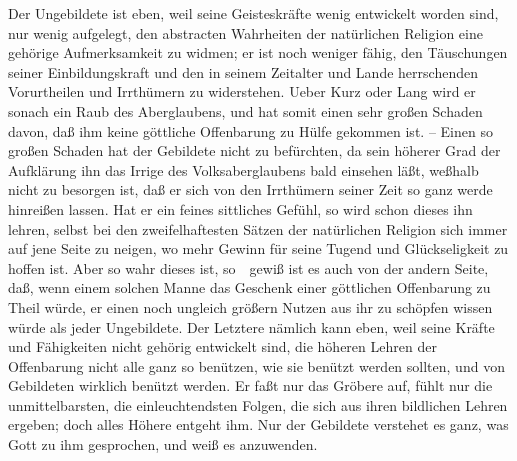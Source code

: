 \begin{aufza}
\item {} Der Ungebildete ist eben, weil seine Geisteskräfte wenig entwickelt worden sind, nur wenig aufgelegt, den abstracten Wahrheiten der natürlichen Religion eine gehörige Aufmerksamkeit zu widmen; er ist noch weniger fähig, den Täuschungen seiner Einbildungskraft und den in seinem Zeitalter und Lande herrschenden Vorurtheilen und Irrthümern zu widerstehen. Ueber Kurz oder Lang wird er sonach ein Raub des Aberglaubens, und hat somit einen sehr großen Schaden davon, daß ihm keine göttliche Offenbarung zu Hülfe gekommen ist. -- Einen so großen Schaden hat der Gebildete nicht zu befürchten, da sein höherer Grad der Aufklärung ihn das Irrige des Volksaberglaubens bald einsehen läßt, weßhalb nicht zu besorgen ist, daß er sich von den Irrthümern seiner Zeit so ganz werde hinreißen lassen. Hat er ein feines sittliches Gefühl, so wird schon dieses ihn lehren, selbst bei den zweifelhaftesten Sätzen der natürlichen Religion sich immer auf jene Seite zu neigen, wo mehr Gewinn für seine Tugend und Glückseligkeit zu hoffen ist. Aber so wahr dieses ist, so~\ gewiß ist es auch von der andern Seite, daß, wenn einem solchen Manne das Geschenk einer göttlichen Offenbarung zu Theil würde, er einen noch ungleich größern Nutzen aus ihr zu schöpfen wissen würde als jeder Ungebildete. Der Letztere nämlich kann eben, weil seine Kräfte und Fähigkeiten nicht gehörig entwickelt sind, die höheren Lehren der Offenbarung nicht alle ganz so benützen, wie sie benützt werden sollten, und von Gebildeten wirklich benützt werden. Er faßt nur das Gröbere auf, fühlt nur die unmittelbarsten, die einleuchtendsten Folgen, die sich aus ihren bildlichen Lehren ergeben; doch alles Höhere entgeht ihm. Nur der Gebildete verstehet es ganz, was Gott zu ihm gesprochen, und weiß es anzuwenden.

\end{aufza}
